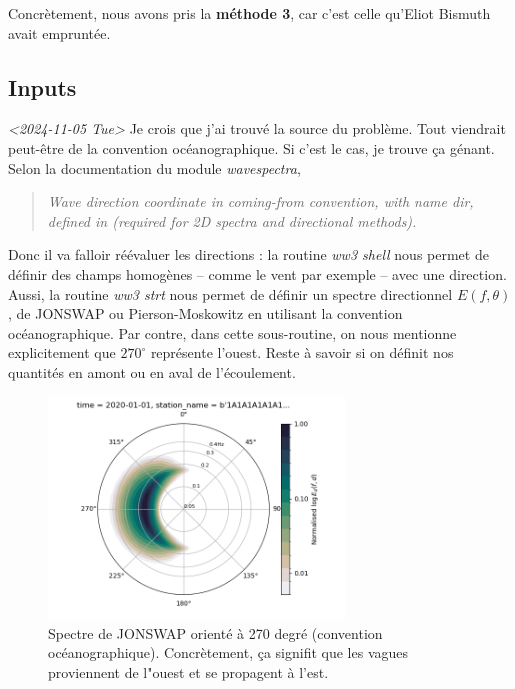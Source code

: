 \documentclass[10pt]{article}
\numberwithin{equation}{section}
\begin{document}
Concrètement, nous avons pris la \textbf{méthode 3}, car c'est celle qu'Eliot Bismuth avait empruntée.
\subsection{Inputs}
\label{sec:org6dc9c79}

\textit{<2024-11-05 Tue> } Je crois que j'ai trouvé la source du problème. Tout viendrait peut-être de la convention océanographique. Si c'est le cas, je trouve ça génant. Selon la documentation du module \emph{wavespectra},

\begin{quote}
\emph{Wave direction coordinate in coming-from convention, with name dir, defined in (required for 2D spectra and directional methods).}
\end{quote}

Donc il va falloir réévaluer les directions : la routine \emph{ww3 shell} nous permet de définir des champs homogènes -- comme le vent par exemple -- avec une direction. Aussi, la routine \emph{ww3 strt} nous permet de définir un spectre directionnel \(E(f,\theta)\), de JONSWAP ou Pierson-Moskowitz en utilisant la convention océanographique. Par contre, dans cette sous-routine, on nous mentionne explicitement que \(270^\circ\) représente l'ouest. Reste à savoir si on définit nos quantités en amont ou en aval de l'écoulement.\bigskip

\begin{figure}[!h]
\begin{center}
\includegraphics[width=0.7\textwidth]{Figures/figures/jonswap-wavespectra3.png}
\begin{minipage}{0.7\textwidth}
\caption{Spectre de JONSWAP orienté à 270 degré (convention océanographique). Concrètement, ça signifit que les vagues proviennent de l"ouest et se propagent à l'est.}
\label{fig:jonswap}
\end{minipage}
\end{center}
\end{figure}
\end{document}
